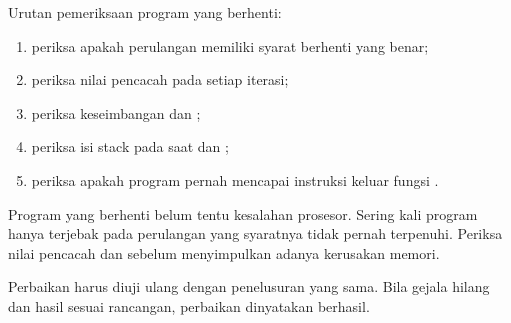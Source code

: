 Urutan pemeriksaan program yang berhenti:

\begin{enumerate}
    \item periksa apakah perulangan memiliki syarat berhenti yang
          benar;
    \item periksa nilai pencacah pada setiap iterasi;
    \item periksa keseimbangan  dan ;
    \item periksa isi stack pada saat  dan ;
    \item periksa apakah program pernah mencapai instruksi keluar
           fungsi .
\end{enumerate}

\begin{peringatanbox}
\vspace{1.1em}
Program yang berhenti belum tentu kesalahan prosesor. Sering kali
program hanya terjebak pada perulangan yang syaratnya tidak pernah
terpenuhi. Periksa nilai pencacah dan  sebelum menyimpulkan
adanya kerusakan memori.
\end{peringatanbox}

\begin{infobox}
\vspace{1.1em}
Perbaikan harus diuji ulang dengan penelusuran yang sama. Bila gejala
hilang dan hasil sesuai rancangan, perbaikan dinyatakan berhasil.
\end{infobox}
